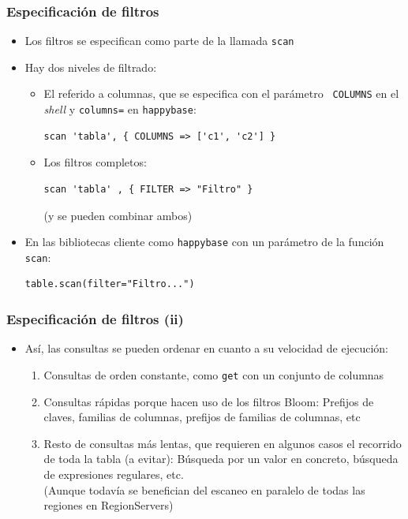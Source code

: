 \documentclass[14pt]{beamer}
\begin{document}
\begin{frame}[fragile]
  \frametitle{Especificación de filtros}
\begin{itemize}
\item Los filtros se especifican como parte de la llamada {\tt scan}
\item Hay dos niveles de filtrado:
  \begin{itemize}
  \item El referido a columnas, que se especifica con el parámetro {\tt
      COLUMNS} en el {\em shell\/} y {\tt columns=} en {\tt happybase}:

\begin{verbatim}
scan 'tabla', { COLUMNS => ['c1', 'c2'] }
\end{verbatim}

  \item Los filtros completos:

\begin{verbatim}
scan 'tabla' , { FILTER => "Filtro" }
\end{verbatim}

(y se pueden combinar ambos)

  \end{itemize}
\item En las bibliotecas cliente como {\tt happybase} con un parámetro de
  la función {\tt scan}:
\begin{lstlisting}
table.scan(filter="Filtro...")
\end{lstlisting}
\end{itemize}
\end{frame}

\begin{frame}[fragile]
  \frametitle{Especificación de filtros (ii)}
\begin{itemize}
\item Así, las consultas se pueden ordenar en cuanto a su velocidad de
  ejecución:
  \begin{enumerate}
  \item Consultas de orden constante, como {\tt get} con un conjunto de
    columnas
  \item Consultas rápidas porque hacen uso de los filtros Bloom: Prefijos
    de claves, familias de columnas, prefijos de familias de columnas, etc
  \item Resto de consultas más lentas, que requieren en algunos casos el
    recorrido de toda la tabla (a evitar): Búsqueda por un valor en
    concreto, búsqueda de expresiones regulares, etc.\\
    (Aunque todavía se benefician del escaneo en paralelo de todas las
    regiones en RegionServers)
  \end{enumerate}
\end{itemize}
\end{frame}
\end{document}
